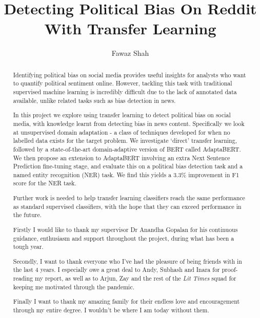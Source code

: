 \documentclass[a4paper, twoside]{report}
\title{Detecting Political Bias On Reddit With Transfer Learning}
\author{Fawaz Shah}
\begin{document}


\begin{abstract}

Identifying political bias on social media provides useful insights for analysts who want to quantify political sentiment online. However, tackling this task with traditional supervised machine learning is incredibly difficult due to the lack of annotated data available, unlike related tasks such as bias detection in news.

In this project we explore using transfer learning to detect political bias on social media, with knowledge learnt from detecting bias in news content. Specifically we look at unsupervised domain adaptation - a class of techniques developed for when no labelled data exists for the target problem. We investigate `direct' transfer learning, followed by a state-of-the-art domain-adaptive version of BERT called AdaptaBERT. We then propose an extension to AdaptaBERT involving an extra Next Sentence Prediction fine-tuning stage, and evaluate this on a political bias detection task and a named entity recognition (NER) task. We find this yields a 3.3\% improvement in F1 score for the NER task.

Further work is needed to help transfer learning classifiers reach the same performance as standard supervised classifiers, with the hope that they can exceed performance in the future.

\end{abstract}

\renewcommand{\abstractname}{Acknowledgements}
\begin{abstract}

Firstly I would like to thank my supervisor Dr Anandha Gopalan for his continuous guidance, enthusiasm and support throughout the project, during what has been a tough year.

Secondly, I want to thank everyone who I've had the pleasure of being friends with in the last 4 years. I especially owe a great deal to Andy, Subhash and Inara for proof-reading my report, as well as to Arjun, Zay and the rest of the \textit{Lit Times} squad for keeping me motivated through the pandemic.

Finally I want to thank my amazing family for their endless love and encouragement through my entire degree. I wouldn't be where I am today without them.

\end{abstract}

\tableofcontents
\listoffigures
\listoftables









\end{document}
